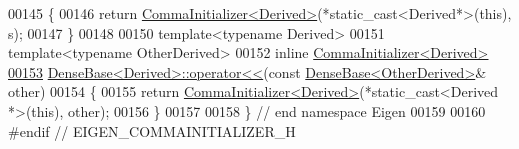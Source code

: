 \begin{DoxyCode}
00145 \{
00146   \textcolor{keywordflow}{return} \hyperlink{group___core___module_struct_eigen_1_1_comma_initializer}{CommaInitializer<Derived>}(*\textcolor{keyword}{static\_cast<}Derived*\textcolor{keyword}{>}(\textcolor{keyword}{this}), s);
00147 \}
00148 
00150 \textcolor{keyword}{template}<\textcolor{keyword}{typename} Derived>
00151 \textcolor{keyword}{template}<\textcolor{keyword}{typename} OtherDerived>
00152 \textcolor{keyword}{inline} \hyperlink{group___core___module_struct_eigen_1_1_comma_initializer}{CommaInitializer<Derived>}
\hyperlink{group___core___module_a0f0e34696162b34762b2bf4bd948f90c}{00153} \hyperlink{group___core___module_a0e575eb0ba6cc6bc5f347872abd8509d}{DenseBase<Derived>::operator<<}(\textcolor{keyword}{const} 
      \hyperlink{group___core___module_class_eigen_1_1_dense_base}{DenseBase<OtherDerived>}& other)
00154 \{
00155   \textcolor{keywordflow}{return} \hyperlink{group___core___module_struct_eigen_1_1_comma_initializer}{CommaInitializer<Derived>}(*\textcolor{keyword}{static\_cast<}Derived *\textcolor{keyword}{>}(\textcolor{keyword}{this}), other);
00156 \}
00157 
00158 \} \textcolor{comment}{// end namespace Eigen}
00159 
00160 \textcolor{preprocessor}{#endif // EIGEN\_COMMAINITIALIZER\_H}
\end{DoxyCode}
